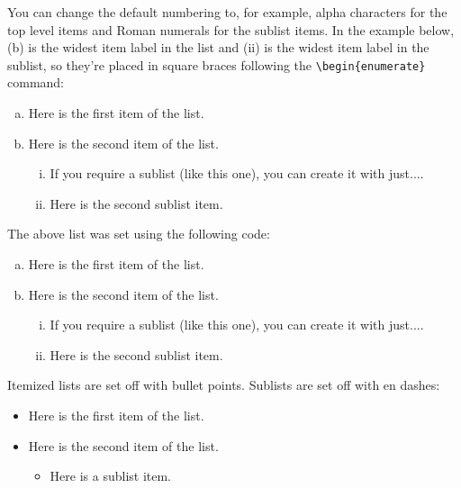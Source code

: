 \documentclass{cje}          %
\theoremstyle{plain}%
\theoremstyle{definition}
\theoremstyle{remark}
\begin{document}
%
You can change the default numbering to, for example, alpha characters for the top level items and Roman numerals for the sublist items. In the example below, (b) is the widest item label in the list and (ii) is the widest item label in the sublist, so they're placed in square braces following the \verb"\begin{enumerate}" command: 
\begin{enumerate}[(b)]
\usealpha
\item Here is the first item of the list.
\item Here is the second item of the list.
  \begin{enumerate}[(ii)]
  \useroman
    \item If you require a sublist (like this one), you can create it with just.... 
    \item Here is the second sublist item.
  \end{enumerate}
\end{enumerate}
The above list was set using the following code:
\begin{smallverbatim}
\begin{enumerate}[(b)]
\usealpha
  \item Here is the first item of the list.
  \item Here is the second item of the list.
    \begin{enumerate}[(ii)]
    \useroman
      \item If you require a sublist (like this one), you can create it with just.... 
      \item Here is the second sublist item.
    \end{enumerate}
\end{enumerate}
\end{smallverbatim}

Itemized lists are set off with bullet points. Sublists are set off with en dashes:
\begin{itemize}
\item Here is the first item of the list.
  \item Here is the second item of the list.
  \begin{itemize}
  \item Here is a sublist item.
  \end{itemize}
\end{itemize}
\end{document}
